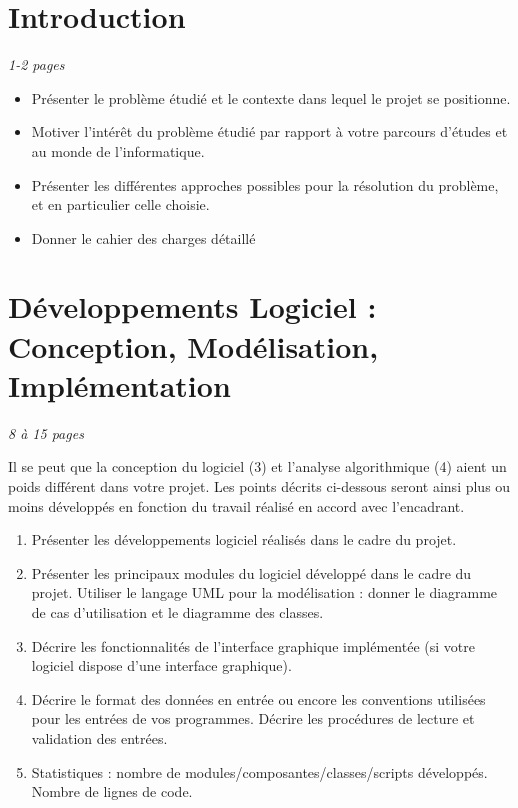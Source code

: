 \documentclass[a4paper]{article} %
\begin{document}



\newpage

\tableofcontents  %

\newpage
\section*{Introduction} %
\emph{1-2 pages}
\begin{itemize}%
\item Présenter le problème étudié et le contexte dans lequel le projet se positionne.
\item Motiver l'intérêt du problème étudié par rapport à votre parcours d'études et au monde de l'informatique.
\item	Présenter les différentes approches possibles pour la résolution du problème, et en particulier celle choisie.
\item Donner le cahier des charges détaillé
\end{itemize}


\section{Développements Logiciel : Conception, Modélisation, Implémentation} 
\emph{8 à 15 pages}

Il se peut que la conception du logiciel (3) et l'analyse algorithmique (4) aient un poids différent dans votre projet. Les points décrits ci-dessous seront ainsi plus ou moins développés en fonction du travail réalisé en accord avec l'encadrant. 
\begin{enumerate}%
\item Présenter les développements logiciel réalisés dans le cadre du projet.
\item Présenter les principaux modules du logiciel développé dans le cadre du projet. Utiliser le langage UML pour la modélisation : donner le diagramme de cas d'utilisation et le diagramme des classes.
\item Décrire les fonctionnalités de l'interface graphique implémentée (si votre logiciel dispose d'une interface graphique).
\item Décrire le format des données en entrée ou encore les conventions utilisées pour les entrées de vos programmes. Décrire les procédures de lecture et validation des entrées.
\item Statistiques : nombre de modules/composantes/classes/scripts développés. Nombre de lignes de code.
\end{enumerate}
\end{document}
